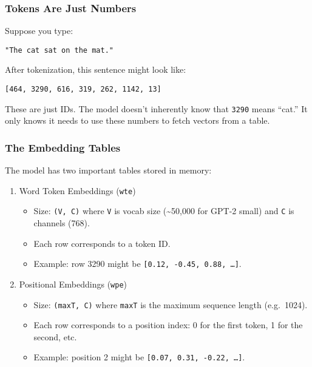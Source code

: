 \documentclass[
  letterpaper,
  DIV=11,
  numbers=noendperiod]{scrreprt}
\providecommand{\tightlist}{%
  \setlength{\itemsep}{0pt}\setlength{\parskip}{0pt}}
\begin{document}
\subsubsection{Tokens Are Just Numbers}\label{tokens-are-just-numbers}

Suppose you type:

\begin{verbatim}
"The cat sat on the mat."
\end{verbatim}

After tokenization, this sentence might look like:

\begin{verbatim}
[464, 3290, 616, 319, 262, 1142, 13]
\end{verbatim}

These are just IDs. The model doesn't inherently know that \texttt{3290}
means ``cat.'' It only knows it needs to use these numbers to fetch
vectors from a table.

\subsubsection{The Embedding Tables}\label{the-embedding-tables}

The model has two important tables stored in memory:

\begin{enumerate}
\def\labelenumi{\arabic{enumi}.}
\item
  Word Token Embeddings (\texttt{wte})

  \begin{itemize}
  \tightlist
  \item
    Size: \texttt{(V,\ C)} where \texttt{V} is vocab size
    (\textasciitilde50,000 for GPT-2 small) and \texttt{C} is channels
    (768).
  \item
    Each row corresponds to a token ID.
  \item
    Example: row 3290 might be \texttt{{[}0.12,\ -0.45,\ 0.88,\ …{]}}.
  \end{itemize}
\item
  Positional Embeddings (\texttt{wpe})

  \begin{itemize}
  \tightlist
  \item
    Size: \texttt{(maxT,\ C)} where \texttt{maxT} is the maximum
    sequence length (e.g.~1024).
  \item
    Each row corresponds to a position index: 0 for the first token, 1
    for the second, etc.
  \item
    Example: position 2 might be \texttt{{[}0.07,\ 0.31,\ -0.22,\ …{]}}.
  \end{itemize}
\end{enumerate}
\end{document}
